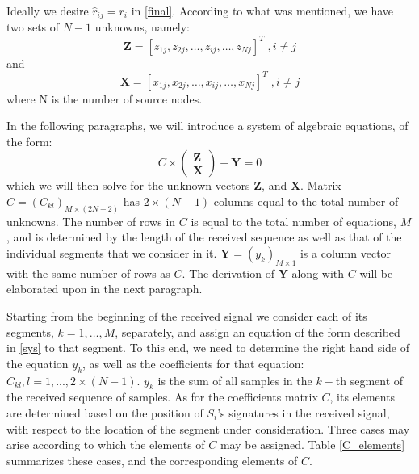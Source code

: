 \documentclass[conference]{IEEEtran}
\begin{document}
Ideally we desire $\hat{r}_{ij}=r_i$ in \ref{final}. According to what was mentioned, we have two sets of $N-1$ unknowns, namely: 
\begin{equation}
\mathbf{Z} = \left[z_{1j},z_{2j},\ldots ,z_{ij},\ldots ,z_{Nj} \right]^T  \; , i \neq j
\label{Z}
\end{equation}
and
\begin{equation}
\mathbf{X} = \left[x_{1j},x_{2j},\ldots,x_{ij},\ldots,x_{Nj} \right]^T   \; ,   i \neq j
\label{X}
\end{equation}
where N is the number of source nodes. 

In the following paragraphs, we will introduce a system of algebraic equations, of the form:
\begin{equation}
C\times \left(\begin{array}{c}\mathbf{Z}\\\mathbf{X}\end{array}\right) - \mathbf{Y} = 0
\label{sys}
\end{equation}
which we will then solve for the unknown vectors $\mathbf{Z}$, and $\mathbf{X}$.
Matrix $C = (C_{kl})_{M\times(2N-2)}$ has $2 \times (N-1)$ columns equal to the total number of unknowns. The number of rows in $C$ is equal to the total number of equations, $M$, and is determined by the length of the received sequence as well as that of the individual segments that we consider in it. $\mathbf{Y} = (y_k)_{M\times1}$ is a column vector with the same number of rows as $C$. The derivation of $\mathbf{Y}$ along with $C$ will be elaborated upon in the next paragraph. 

Starting from the beginning of the received signal we consider each of its segments, $k = 1, \ldots, M$, separately, and assign an equation of the form described in \ref{sys} to that segment. To this end, we need to determine the right hand side of the equation $y_k$, as well as the coefficients for that equation: $C_{kl}, l = 1,...,2\times (N-1)$. $y_k$ is the sum of all samples in the $k-$th segment of the received sequence of samples. As for the coefficients matrix $C$, its elements are determined based on the position of $S_i$'s signatures in the received signal, with respect to the location of the segment under consideration. Three cases may arise according to which the elements of $C$ may be assigned. Table \ref{C_elements} summarizes these cases, and the corresponding elements of $C$.
\end{document}
